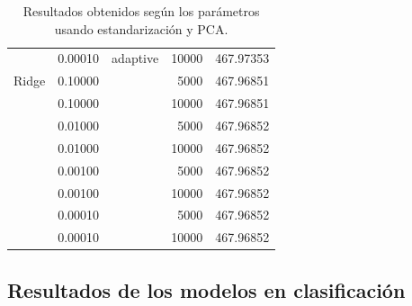 \documentclass[a4paper, 20pt]{article}
\begin{document}
\begin{table}[H]
\begin{tabular}{lrlrr}
             & 0.00010   & adaptive & 10000       & 467.97353 \\
Ridge        & 0.10000   &          & 5000        & 467.96851 \\
             & 0.10000   &          & 10000       & 467.96851 \\
             & 0.01000   &          & 5000        & 467.96852 \\
             & 0.01000   &          & 10000       & 467.96852 \\
             & 0.00100   &          & 5000        & 467.96852 \\
             & 0.00100   &          & 10000       & 467.96852 \\
             & 0.00010   &          & 5000        & 467.96852 \\
             & 0.00010   &          & 10000       & 467.96852
\end{tabular}
\caption{Resultados obtenidos según los parámetros usando estandarización y PCA.}
\end{table}

\subsection{Resultados de los modelos en clasificación}
\label{apend:clas}
\end{document}
